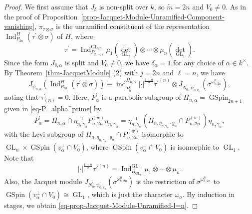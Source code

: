 \documentclass[12pt]{amsart}
\newcommand{\ind}{\operatorname{ind}}
\newcommand{\wt}{\widetilde}
\theoremstyle{remark}
\DeclareMathOperator{\Ind}{Ind}
\DeclareMathOperator{\GL}{GL}
\DeclareMathOperator{\GSpin}{GSpin}
\begin{document}
\begin{proof}
We first assume that $J_{\delta}$ is non-split over $k$, so $\wt m=2n$ and $V_0\not=0$. As in the proof of Proposition~\ref{prop-Jacquet-Module-Unramified-Component-vanishing}, $\pi_{\tau\otimes \sigma}$ is the unramified constituent of the representation $\Ind_{P_{2n}}^{H}(\tau^\prime \otimes \sigma)$ of $H$, where
\begin{equation*}
	\tau^\prime= \Ind_{P_{2, \cdots, 2}}^{\GL_{2n}} \mu_1 ({\det}_{\GL_2}) \otimes \cdots \otimes \mu_n ({\det}_{\GL_2})  .
\end{equation*}
Since the form $J_{\delta, \alpha}$ is split and $V_0\not=0$, we have $\delta_{\alpha}=1$ for any choice of $\alpha\in k^\times$. By Theorem~\ref{thm-JacquetModule} (2) with $j=2n$ and $\ell=n$, we have 
\begin{equation*}
	J_{\psi_{n,\alpha}}(\Ind_{P_{2n}}^{H}(\tau^\prime \otimes \sigma))\equiv  \ind_{P_{\alpha}^{\prime}}^{H_{n,\alpha}} |\cdot|^{\frac{1-n}{2}} {\tau^\prime}^{(n)}\otimes  J_{N_{0}^\prime, \psi_{0,v_\alpha} ^\prime}(\sigma^{\omega_{b,2n}^n}),
\end{equation*}
noting that $\tau^\prime_{(n)}=0$. Here, $P_{\alpha}^\prime$ is a parabolic subgroup of $H_{n,\alpha}= \GSpin_{2n+1}$ given in \eqref{eq-P_alpha^prime} by
\begin{equation*}
P_{\alpha}^\prime=H_{n,\alpha} \cap \eta_{n,\gamma_\alpha}^{-1} P_{n,2n}^{(w)} \eta_{n,\gamma_\alpha}= \eta_{n,\gamma_\alpha}^{-1} (H_{n, \eta_{n,\gamma_\alpha} \cdot y_\alpha }\cap P_{n,2n}^{(w)}) \eta_{n,\gamma_\alpha}, 
\end{equation*}
with the Levi subgroup of $H_{n, \eta_{n,\gamma_\alpha} \cdot y_\alpha }\cap P_{n,2n}^{(w)}$ isomorphic to $\GL_n\times \GSpin(v_{\alpha}^\perp \cap V_0)$, where $\GSpin(v_\alpha^\perp \cap V_0)$ is isomorphic to $\GL_1$.
Note that 
\begin{equation}
\label{eq-prop-Jacquet-Module-Unramified-l=n-eq1}
|\cdot|^{\frac{1-n}{2}}{\tau'}^{(n)}=\Ind_{B_{\GL_{n}}}^{\GL_{n}}\mu_1\otimes \cdots \otimes \mu_{n}.
\end{equation}
 Also, the Jacquet module $J_{N_{0}^\prime, \psi_{0,v_\alpha} ^\prime}(\sigma^{\omega_{b,2n}^n})$ is the restriction of $\sigma^{\omega_{b,2n}^n}$ to $\GSpin(v_{\alpha}^\perp \cap V_0)\cong \GL_1$, which is just the character $\omega_\sigma$. By induction in stages, we obtain \eqref{eq-prop-Jacquet-Module-Unramified-l=n}.


\end{proof}
\end{document}
